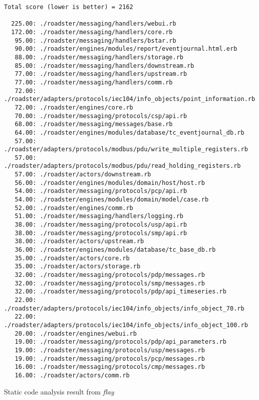 \begin{listing}[H]
	\begin{verbatim}
Total score (lower is better) = 2162

  225.00: ./roadster/messaging/handlers/webui.rb
  172.00: ./roadster/messaging/handlers/core.rb
   95.00: ./roadster/messaging/handlers/bstar.rb
   90.00: ./roadster/engines/modules/report/eventjournal.html.erb
   88.00: ./roadster/messaging/handlers/storage.rb
   85.00: ./roadster/messaging/handlers/downstream.rb
   77.00: ./roadster/messaging/handlers/upstream.rb
   77.00: ./roadster/messaging/handlers/comm.rb
   72.00: ./roadster/adapters/protocols/iec104/info_objects/point_information.rb
   72.00: ./roadster/engines/core.rb
   70.00: ./roadster/messaging/protocols/csp/api.rb
   68.00: ./roadster/messaging/messages/base.rb
   64.00: ./roadster/engines/modules/database/tc_eventjournal_db.rb
   57.00: ./roadster/adapters/protocols/modbus/pdu/write_multiple_registers.rb
   57.00: ./roadster/adapters/protocols/modbus/pdu/read_holding_registers.rb
   57.00: ./roadster/actors/downstream.rb
   56.00: ./roadster/engines/modules/domain/host/host.rb
   54.00: ./roadster/messaging/protocols/pcp/api.rb
   54.00: ./roadster/engines/modules/domain/model/case.rb
   52.00: ./roadster/engines/comm.rb
   51.00: ./roadster/messaging/handlers/logging.rb
   38.00: ./roadster/messaging/protocols/usp/api.rb
   38.00: ./roadster/messaging/protocols/smp/api.rb
   38.00: ./roadster/actors/upstream.rb
   36.00: ./roadster/engines/modules/database/tc_base_db.rb
   35.00: ./roadster/actors/core.rb
   35.00: ./roadster/actors/storage.rb
   32.00: ./roadster/messaging/protocols/pdp/messages.rb
   32.00: ./roadster/messaging/protocols/smp/messages.rb
   32.00: ./roadster/messaging/protocols/pdp/api_timeseries.rb
   22.00: ./roadster/adapters/protocols/iec104/info_objects/info_object_70.rb
   22.00: ./roadster/adapters/protocols/iec104/info_objects/info_object_100.rb
   20.00: ./roadster/engines/webui.rb
   19.00: ./roadster/messaging/protocols/pdp/api_parameters.rb
   19.00: ./roadster/messaging/protocols/usp/messages.rb
   19.00: ./roadster/messaging/protocols/pcp/messages.rb
   16.00: ./roadster/messaging/protocols/cmp/messages.rb
   16.00: ./roadster/actors/comm.rb
	\end{verbatim}
	\caption{Static code analysis result from \emph{flay}}
	\label{lst:metrics:flay}
\end{listing}

